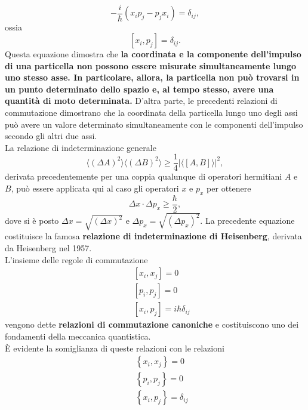 \documentclass[a4paper,12pt,oneside]{book}
\begin{document}
\begin{equation}
-\frac{i}{\hbar}\left( x_ip_j-p_jx_i\right) =\delta _{ij},
\end{equation}
ossia
\begin{equation}
\left[ x_i, p_j \right] =\delta _{ij}.
\end{equation}
Questa equazione dimostra che \textbf{la coordinata e la componente dell'impulso di una particella non possono essere misurate simultaneamente lungo uno stesso asse. In particolare, allora, la particella non può trovarsi in un punto determinato dello spazio e, al tempo stesso, avere una quantità di moto determinata.} D'altra parte, le precedenti relazioni di commutazione dimostrano che la coordinata della particella lungo uno degli assi può avere un valore determinato simultaneamente con le componenti dell'impulso secondo gli altri due assi.\\
La relazione di indeterminazione generale
\begin{equation}
\langle \left( \Delta A\right)^2\rangle \langle \left( \Delta B\right)^2\rangle \geq \frac{1}{4}\vert \langle \left[A,B\right] \rangle \vert ^2 ,
\end{equation}
derivata precedentemente per una coppia qualunque di operatori hermitiani $A$ e $B$, può essere applicata qui al caso gli operatori $x$ e $p_x$ per ottenere
\begin{equation}
\Delta x \cdot \Delta p_x \geq \frac{\hbar}{2} ,
\end{equation}
dove si è posto $\Delta x = \sqrt{\left(\Delta x\right) ^2}$ e $\Delta p_x = \sqrt{\left(\Delta p_x\right) ^2}$. La precedente equazione costituisce la famosa \textbf{relazione di indeterminazione di Heisenberg}, derivata da Heisenberg nel 1957.\\
L'insieme delle regole di commutazione
\begin{eqnarray}
& &\left[ x_i, x_j\right]=0 \nonumber\\
& &\left[ p_i, p_j\right]=0\\
& &\left[ x_i, p_j\right]=i\hbar \delta _{ij}\nonumber 
\end{eqnarray}
vengono dette \textbf{relazioni di commutazione canoniche} e costituiscono uno dei fondamenti della meccanica quantistica.\\
È evidente la somiglianza di queste relazioni con le relazioni
\begin{eqnarray}
& &\left\{ x_i, x_j\right\}=0 \nonumber\\
& &\left\{ p_i, p_j\right\}=0\\
& &\left\{ x_i, p_j\right\}=\delta _{ij}\nonumber 
\end{eqnarray}
\end{document}
